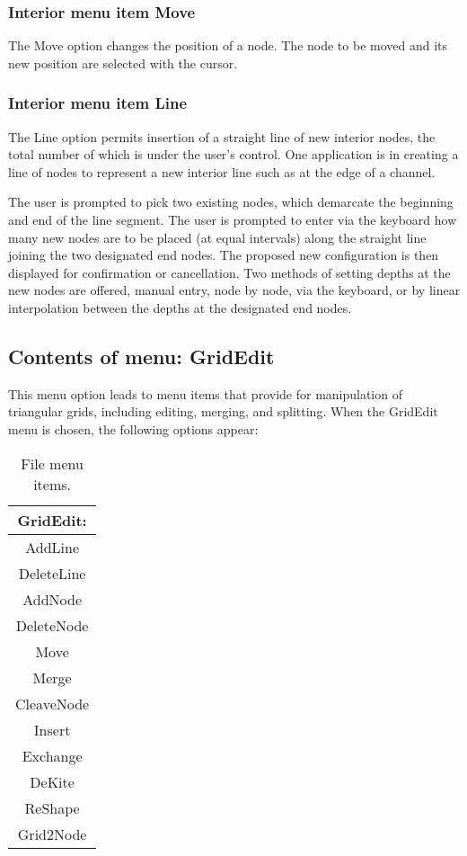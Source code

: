 \documentclass{article}
\begin{document}
\subsubsection[Interior menu item Move]{Interior menu item Move}
The Move option changes the position of a node. The node to be moved and its new position are selected with the cursor.

\subsubsection[Interior menu item Line]{Interior menu item Line}
The Line option permits insertion of a straight line of new interior nodes, the total number of which is under the user's control. One application is in creating a line of nodes to represent a new interior line such as at the edge of a channel.

The user is prompted to pick two existing nodes, which demarcate the beginning and end of the line segment. The user is prompted to enter via the keyboard how many new nodes are to be placed (at equal intervals) along the straight line joining the two designated end nodes. The proposed new configuration is then displayed for confirmation or cancellation. Two methods of setting depths at the new nodes are offered, manual entry, node by node, via the keyboard, or by linear interpolation between the depths at the designated end nodes.

\subsection{Contents of menu: GridEdit}
This menu option leads to menu items that provide for manipulation of triangular grids, including editing, merging, and splitting. When the GridEdit menu is chosen, the following options appear:

\begin{table}[htb!]
 \caption{File menu items.}
  \begin{center}
   \begin{tabular}{|c|}
    \hline
GridEdit:\\     \hline
AddLine \\ DeleteLine \\ AddNode \\ DeleteNode \\ Move \\ Merge \\    \hline
CleaveNode \\ Insert \\ Exchange \\ DeKite \\ ReShape \\     \hline
Grid2Node \\
    \hline
   \end{tabular}
   \label{tab:GRIDEDIT}
  \end{center}
\end{table}
\end{document}
